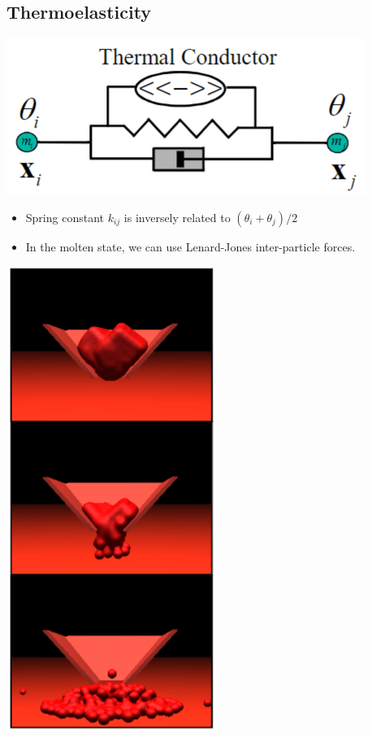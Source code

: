 \documentclass{article}
\begin{document}
\subsection*{Thermoelasticity}
\begin{center}
    \includegraphics*[scale=1]{W5_5.png}    
\end{center}
\begin{itemize}
    \item Spring constant $k_{ij}$ is inversely related to $(\theta_i + \theta_j) / 2$
    \item In the molten state, we can use Lenard-Jones inter-particle forces.
\end{itemize}
\begin{center}
    \includegraphics*[scale=0.8]{W5_6.png}
\end{center}
\end{document}
